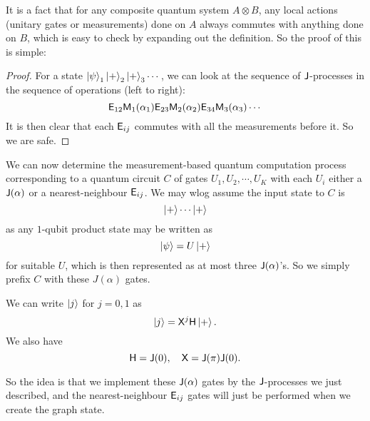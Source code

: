 It is a fact that for any composite quantum system $A \otimes B$, any local actions (unitary gates or measurements) done on $A$ always commutes with anything done on $B$, which is easy to check by expanding out the definition. So the proof of this is simple:

\begin{proof}
  For a state $\left\lvert \psi\right\rangle_1 \left\lvert +\right\rangle_2 \left\lvert +\right\rangle_3\cdots$, we can look at the sequence of $\mathsf{J}$-processes in the sequence of operations (left to right):
  \[
    \mathsf{E}_{12} \mathsf{M}_1(\alpha_1) \mathsf{E}_{23}\mathsf{M}_2(\alpha_2) \mathsf{E}_{34} \mathsf{M}_3(\alpha_3)\cdots
  \]
  It is then clear that each $\mathsf{E}_{ij}$ commutes with all the measurements before it. So we are safe.
\end{proof}

We can now determine the measurement-based quantum computation process corresponding to a quantum circuit $C$ of gates $U_1, U_2, \cdots, U_K$ with each $U_i$ either a $\mathsf{J}(\alpha)$ or a nearest-neighbour $\mathsf{E}_{ij}$. We may wlog assume the input state to $C$ is
\[
  \left\lvert +\right\rangle\cdots\left\lvert +\right\rangle
\]
as any $1$-qubit product state may be written as
\[
  \left\lvert \psi\right\rangle = U \left\lvert +\right\rangle
\]
for suitable $U$, which is then represented as at most three $\mathsf{J}(\alpha)$'s. So we simply prefix $C$ with these $J(\alpha)$ gates.

\begin{eg}
  We can write $\left\lvert j\right\rangle$ for $j = 0, 1$ as
  \[
    \left\lvert j\right\rangle = \mathsf{X}^j\mathsf{H} \left\lvert +\right\rangle.
  \]
  We also have
  \[
    \mathsf{H} = \mathsf{J}(0),\quad \mathsf{X} = \mathsf{J}(\pi)\mathsf{J}(0).
  \]
\end{eg}

So the idea is that we implement these $\mathsf{J}(\alpha)$ gates by the $\mathsf{J}$-processes we just described, and the nearest-neighbour $\mathsf{E}_{ij}$ gates will just be performed when we create the graph state.

